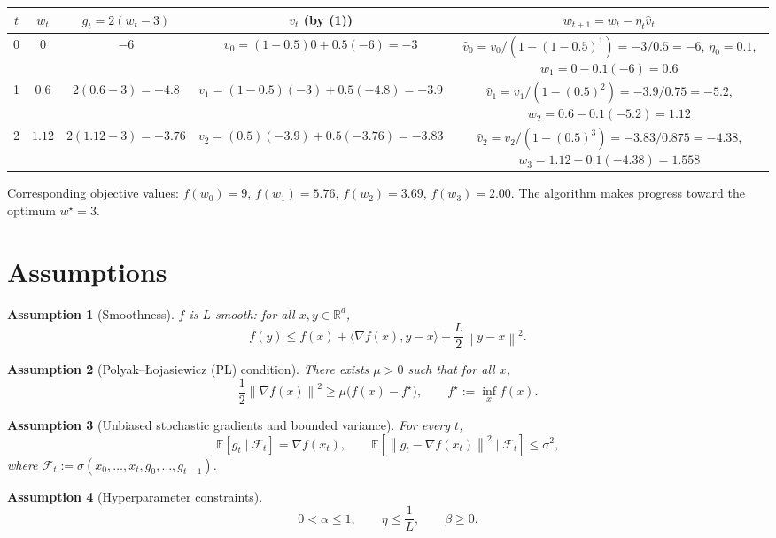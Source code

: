 \documentclass{article}
\newtheorem{assumption}{Assumption}
\newcommand{\E}{\mathbb{E}}
\newcommand{\norm}[1]{\left\lVert #1\right\rVert}
\begin{document}
\begin{center}
\begin{tabular}{c|c|c|c|c}
$t$ & $w_t$ & $g_t=2(w_t-3)$ & $v_t$ (by (1)) & $w_{t+1}=w_t-\eta_t\hat v_t$\\ \hline
0 & $0$ & $-6$ &
$v_0=(1-0.5)0+0.5(-6)=-3$ &
$\hat v_0=v_0/(1-(1-0.5)^{1})=-3/0.5=-6$, $\eta_0=0.1$, $w_1=0-0.1(-6)=0.6$\\[4pt]
1 & $0.6$ & $2(0.6-3)=-4.8$ &
$v_1=(1-0.5)(-3)+0.5(-4.8)=-3.9$ &
$\hat v_1=v_1/(1-(0.5)^{2})=-3.9/0.75=-5.2$, $w_2=0.6-0.1(-5.2)=1.12$\\[4pt]
2 & $1.12$ & $2(1.12-3)=-3.76$ &
$v_2=(0.5)(-3.9)+0.5(-3.76)=-3.83$ &
$\hat v_2=v_2/(1-(0.5)^{3})=-3.83/0.875=-4.38$, $w_3=1.12-0.1(-4.38)=1.558$\\
\end{tabular}
\end{center}

Corresponding objective values:
$f(w_0)=9$, $f(w_1)=5.76$, $f(w_2)=3.69$, $f(w_3)=2.00$.  
The algorithm makes progress toward the optimum $w^\star=3$.

\section*{Assumptions}
\begin{assumption}[Smoothness]\label{ass:smooth}
$f$ is $L$‑smooth: for all $x,y\in\mathbb{R}^d$,
\[
f(y)\le f(x)+\langle\nabla f(x),y-x\rangle+\frac{L}{2}\norm{y-x}^2 .
\]
\end{assumption}
\begin{assumption}[Polyak–Łojasiewicz (PL) condition]\label{ass:pl}
There exists $\mu>0$ such that for all $x$,
\[
\frac{1}{2}\norm{\nabla f(x)}^2\ge \mu\bigl(f(x)-f^\star\bigr),
\qquad f^\star:=\inf_x f(x).
\]
\end{assumption}
\begin{assumption}[Unbiased stochastic gradients and bounded variance]\label{ass:unbiased}
For every $t$, 
\[
\E\!\left[g_t\mid \mathcal{F}_t\right]=\nabla f(x_t),\qquad
\E\!\left[\norm{g_t-\nabla f(x_t)}^2\mid\mathcal{F}_t\right]\le\sigma^2,
\]
where $\mathcal{F}_t:=\sigma(x_0,\dots,x_t,g_0,\dots,g_{t-1})$.
\end{assumption}
\begin{assumption}[Hyperparameter constraints]\label{ass:hyper}
\[
0<\alpha\le 1,\qquad \eta\le \frac{1}{L},\qquad \beta\ge 0 .
\]
\end{assumption}
\end{document}
